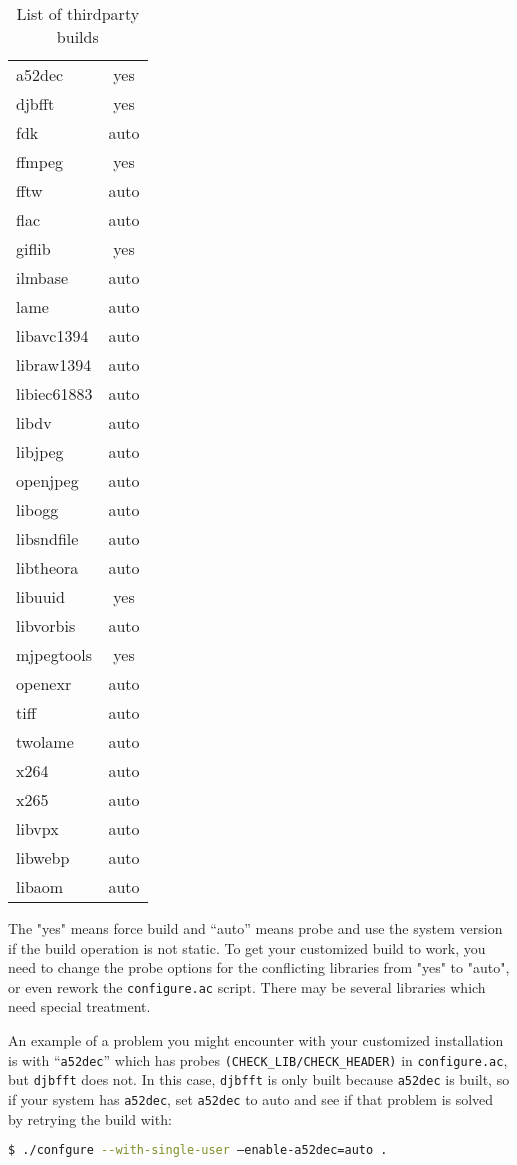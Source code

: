 \begin{table}[htpb]
    \centering
    \caption{List of thirdparty builds}
    \label{tab:List_of_thirdparty_builds}
    \begin{tabular}{m{8em}c}
        \toprule
 	a52dec   & yes\\
 	djbfft   & yes\\
	fdk      & auto\\
 	ffmpeg   & yes\\
 	fftw     & auto\\
 	flac     & auto\\
 	giflib   & yes\\
 	ilmbase&auto\\
 	lame    &  auto\\
 	libavc1394&auto\\
 	libraw1394&auto\\
 	libiec61883&auto\\
	libdv     &auto\\
 	libjpeg   &auto\\
 	openjpeg  &auto\\
 	libogg    &auto\\
 	libsndfile&auto\\
 	libtheora&auto\\
 	libuuid  & yes\\
 	libvorbis&auto\\
 	mjpegtools&yes\\
 	openexr   &auto\\
	tiff      &auto\\
 	twolame   &auto\\
 	x264      &auto\\
 	x265      &auto\\
 	libvpx	&auto\\
	libwebp&auto\\
	libaom&	auto\\
    \bottomrule
    \end{tabular}
\end{table}


The "yes" means force build and “auto” means probe and use the system version if the build operation is not static.  
To get your customized build to work, you need to change the probe options for the conflicting libraries from "yes" to "auto", or even rework the \texttt{configure.ac} script.  
There may be several libraries which need special treatment.

An example of a problem you might encounter with your customized installation is with “\texttt{a52dec}” which has probes \texttt{(CHECK\_LIB/CHECK\_HEADER)} in \texttt{configure.ac}, but \texttt{djbfft} does not.  
In this case, \texttt{djbfft} is only built because \texttt{a52dec} is built, so if your system has \texttt{a52dec}, set \texttt{a52dec} to auto and see if that problem is solved by retrying the build with:  
\begin{lstlisting}[language=bash]
$ ./confgure --with-single-user –enable-a52dec=auto .
\end{lstlisting}

